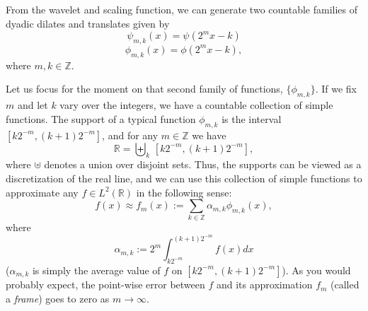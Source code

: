 From the wavelet and scaling function, we can generate two countable families
of dyadic dilates and translates given by
\begin{equation*}
\psi_{m,k}(x) = \psi(2^mx - k)
\end{equation*}
\begin{equation*}
\phi_{m,k}(x) = \phi(2^mx - k),
\end{equation*}
where $m,k \in \mathbb{Z}$.

Let us focus for the moment on that second family of functions, $\{\phi_{m,k}\}$.
If we fix $m$ and let $k$ vary over the integers, we have a countable collection of
simple functions. The support of a typical function $\phi_{m,k}$ is the interval
$[k2^{-m}, (k+1)2^{-m}]$, and for any $m \in \mathbb{Z}$ we have
\begin{equation*}
\mathbb{R} = \displaystyle\biguplus_k\,[k2^{-m}, (k+1)2^{-m}],
\end{equation*}
where $\uplus$ denotes a union over disjoint sets. Thus, the supports can be viewed as
a discretization of the real line, and we can use this collection of simple functions
to approximate any $f \in L^2(\mathbb{R})$ in the following sense:
\begin{equation*}
f(x) \approx f_m(x) := \displaystyle\sum_{k \in \mathbb{Z}}\alpha_{m,k}\phi_{m,k}(x),
\end{equation*}
where
\begin{equation*}
\alpha_{m,k} := 2^m \displaystyle \int_{k2^{-m}}^{(k+1)2^{-m}}f(x) dx
\end{equation*}
($\alpha_{m,k}$ is simply the average value of $f$ on $[k2^{-m},(k+1)2^{-m}]$). As you
would probably expect, the point-wise error between $f$ and its approximation $f_m$
(called a \emph{frame}) goes to zero as $m \to \infty$.

